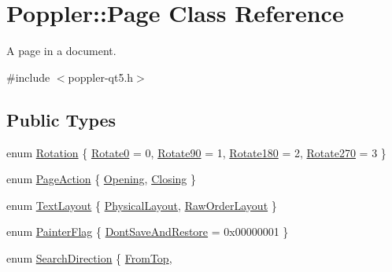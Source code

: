 \hypertarget{class_poppler_1_1_page}{}\section{Poppler\+:\+:Page Class Reference}
\label{class_poppler_1_1_page}


A page in a document.  




{\ttfamily \#include $<$poppler-\/qt5.\+h$>$}

\subsection*{Public Types}
\begin{DoxyCompactItemize}
\item 
enum \hyperlink{class_poppler_1_1_page_a9c9a4e1bc301cd2ab4eac0b51f0dc0ec}{Rotation} \{ \hyperlink{class_poppler_1_1_page_a9c9a4e1bc301cd2ab4eac0b51f0dc0eca6bd60f29c8d73b686ceb2030964823db}{Rotate0} = 0, 
\hyperlink{class_poppler_1_1_page_a9c9a4e1bc301cd2ab4eac0b51f0dc0eca33ccdf5b539c2917a2bd881b1c3dcd72}{Rotate90} = 1, 
\hyperlink{class_poppler_1_1_page_a9c9a4e1bc301cd2ab4eac0b51f0dc0eca85c0c177d6399d52960c235c6fd4aa09}{Rotate180} = 2, 
\hyperlink{class_poppler_1_1_page_a9c9a4e1bc301cd2ab4eac0b51f0dc0eca10c797b50fc502d31facf2766581dcf3}{Rotate270} = 3
 \}
\item 
enum \hyperlink{class_poppler_1_1_page_ac77a0b29e76e6ddcb6fb177ef3e3396f}{Page\+Action} \{ \hyperlink{class_poppler_1_1_page_ac77a0b29e76e6ddcb6fb177ef3e3396faf5dcfdca988348f8e8fb7885e0cc6138}{Opening}, 
\hyperlink{class_poppler_1_1_page_ac77a0b29e76e6ddcb6fb177ef3e3396fa60dc4631fb47a5f8bdef5c790a052f62}{Closing}
 \}
\item 
enum \hyperlink{class_poppler_1_1_page_ac2fe47d36367d63d78f493bec5ea0450}{Text\+Layout} \{ \hyperlink{class_poppler_1_1_page_ac2fe47d36367d63d78f493bec5ea0450a88a6ed05c8cf9566e5fc08068c0301b8}{Physical\+Layout}, 
\hyperlink{class_poppler_1_1_page_ac2fe47d36367d63d78f493bec5ea0450a367163078500f3158bdeeb26166dd46d}{Raw\+Order\+Layout}
 \}
\item 
enum \hyperlink{class_poppler_1_1_page_a7b9a4e7b8a2bb20b036e862c7409be6b}{Painter\+Flag} \{ \hyperlink{class_poppler_1_1_page_a7b9a4e7b8a2bb20b036e862c7409be6baf8d6975a6cf5a3809a4cd29d9959d9d1}{Dont\+Save\+And\+Restore} = 0x00000001
 \}
\item 
enum \hyperlink{class_poppler_1_1_page_a693343ece22aa954a6357e97625e7c93}{Search\+Direction} \{ \hyperlink{class_poppler_1_1_page_a693343ece22aa954a6357e97625e7c93a813a28f0e91d1df1a18a431d1da24cf2}{From\+Top}, 

\end{DoxyCompactItemize}
